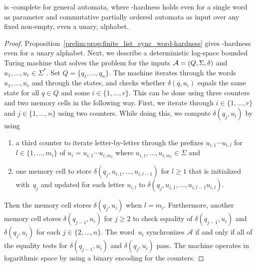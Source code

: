 \begin{theorem}
	\label{prelim:thm:finite_list_sync_word}
	\DFASW is \LOGSPACE-complete for general automata, where \LOGSPACE-hardness holds 
	even for a single word as parameter
	and commutative partially ordered automata as input over any fixed non-empty, even a unary,
	alphabet.	
\end{theorem}
\begin{proof} %
	Proposition~\ref{prelim:prop:finite_list_sync_word-hardness} 
	gives \LOGSPACE-hardness even for a unary alphabet. 
	Next, 
	we describe a deterministic log-space bounded Turing machine
	that solves the problem for the inputs 
	$\mathcal A = (Q, \Sigma, \delta)$
	and $u_1, \ldots, u_r \in \Sigma^*$. Set $Q = \{q_1, \ldots, q_n\}$.
	The machine iterates through 
	the words $u_1, \ldots, u_r$
	and through the states, and checks
	whether $\delta(q, u_i)$ equals
	the same state for all $q \in Q$ and some $i \in \{1,\ldots,r\}$.
	This can be done using three counters and two memory cells in the following way.    
	First, we iterate through $i \in \{1,\ldots,r\}$ and $j \in \{1,\ldots,n\}$
	using two counters. While doing this, we compute $\delta(q_j, u_i)$ by using 
	\begin{enumerate} 
		\item     a third counter to iterate
		letter-by-letter through
		the prefixes $u_{i,1} \cdots u_{i,l}$ for $l \in \{1,\ldots,m_i\}$ of $u_i = u_{i,1}\cdots u_{i,m_i}$ 
		where $u_{i,1}, \ldots, u_{i,m_i} \in \Sigma$ and
		
		\item one memory cell to store $\delta(q_j, u_{i,1}, \ldots, u_{i,l-1})$ for $l \ge 1$ that is initialized with~$q_j$ and updated for each letter $u_{i,l}$
		to $\delta(q_j, u_{i,1}, \ldots, u_{i,l-1} u_{i,l})$. 
	\end{enumerate}
	Then the memory cell stores $\delta(q_j, u_i)$ when $l = m_i$.
	Furthermore, another memory cell stores $\delta(q_{j-1}, u_i)$
	for $j \ge 2$ to check equality of $\delta(q_{j-1}, u_i)$ and
	$\delta(q_j, u_i)$ for each $j \in \{2,\ldots,n\}$.
	The word~$u_i$ synchronizes $\mathcal A$
	if and only if all of the equality tests for $\delta(q_{j-1}, u_i)$ and
	$\delta(q_j, u_i)$ pass.
	The machine operates in logarithmic space by using a binary encoding for the counters.
\end{proof}

